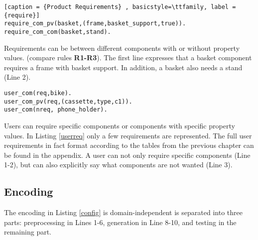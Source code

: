 \begin{lstlisting}[caption = {Product Requirements} , basicstyle=\ttfamily, label = {require}]
require_com_pv(basket,(frame,basket_support,true)).
require_com_com(basket,stand).
\end{lstlisting}

Requirements can be between different components with or without property values. (compare rules \textbf{R1-R3}). The first line expresses that a basket component requires a frame with basket support. In addition, a basket also needs a stand (Line 2). 

\begin{lstlisting}[caption = {User Requirements}, basicstyle=\ttfamily, label = {userreq}]
user_com(req,bike).
user_com_pv(req,(cassette,type,c1)).
user_com(nreq, phone_holder).
\end{lstlisting}

Users can require specific components or components with specific property values. 
In Listing \ref{userreq} only a few requirements are represented. 
The full user requirements in fact format according to the tables from the previous chapter can be found in the appendix. 
A user can not only require specific components (Line 1-2), but can also explicitly say what components are not wanted (Line 3). 

\subsection{Encoding}
The encoding in Listing \ref{config} is domain-independent is separated into three parts: preprocessing in Lines 1-6, generation in Line 8-10, and testing in the remaining part. 

